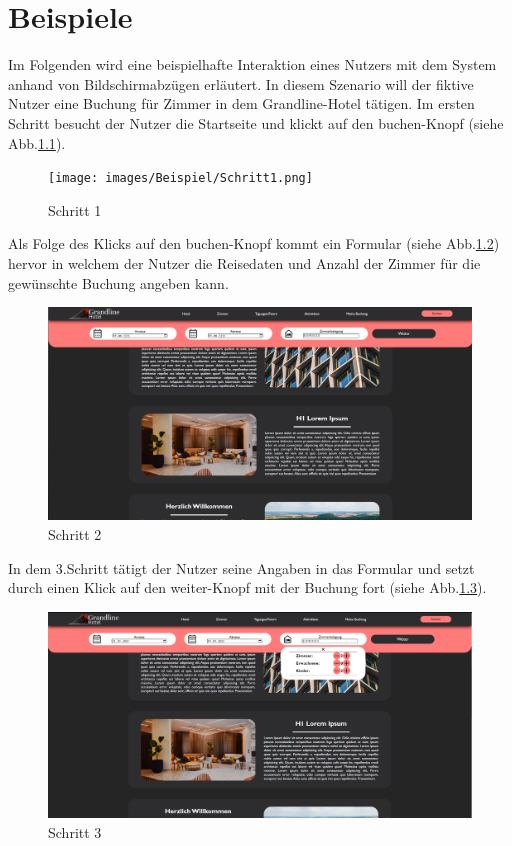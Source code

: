 \chapter{Beispiele}
Im Folgenden wird eine beispielhafte Interaktion eines Nutzers mit dem System anhand von Bildschirmabzügen erläutert. In diesem Szenario will der fiktive Nutzer eine Buchung für Zimmer in dem Grandline-Hotel tätigen. Im ersten Schritt besucht der Nutzer die Startseite und klickt auf den \glqq buchen\grqq-Knopf (siehe Abb.\ref{step1}).
\begin{figure}
	\texttt{[image: images/Beispiel/Schritt1.png]}
	\caption{Schritt 1}
	\label{step1}
\end{figure}
\newline
Als Folge des Klicks auf den \glqq buchen\grqq-Knopf kommt ein Formular (siehe Abb.\ref{step2}) hervor in welchem der Nutzer die Reisedaten und Anzahl der Zimmer für die gewünschte Buchung angeben kann.
\begin{figure}
	\includegraphics[width=\textwidth]{images/Beispiel/Schritt2.png}
	\caption{Schritt 2}
	\label{step2}
\end{figure}
\newpage In dem 3.Schritt tätigt der Nutzer seine Angaben in das Formular und setzt durch einen Klick auf den \glqq weiter\grqq-Knopf mit der Buchung fort (siehe Abb.\ref{step3}).
\begin{figure}
	\includegraphics[width=\textwidth]{images/Beispiel/Schritt3.png}
	\caption{Schritt 3}
	\label{step3}
\end{figure}
